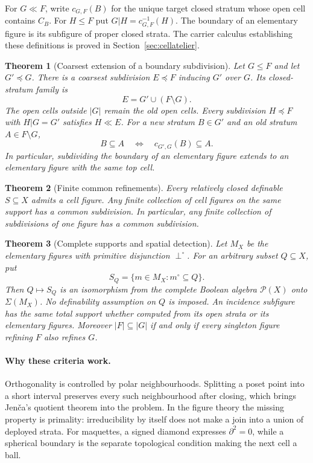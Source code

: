\documentclass[11pt,a4paper]{article}
\newtheorem{theorem}{Theorem}[section]
\theoremstyle{definition}
\begin{document}
For $G\ll F$, write $c_{G,F}(B)$ for the unique target closed stratum whose open cell contains $C_B$. For $H\le F$ put $G|H=c_{G,F}^{-1}(H)$. The boundary of an elementary figure is its subfigure of proper closed strata. The carrier calculus establishing these definitions is proved in Section~\ref{sec:cellatelier}.

\begin{theorem}[Coarsest extension of a boundary subdivision]\label{thm:extension}
Let $G\le F$ and let $G'\preceq G$. There is a coarsest subdivision $E\preceq F$ inducing $G'$ over $G$. Its closed-stratum family is
\[
 E=G'\cup(F\setminus G).
\]
The open cells outside $|G|$ remain the old open cells. Every subdivision $H\preceq F$ with $H|G=G'$ satisfies $H\ll E$. For a new stratum $B\in G'$ and an old stratum $A\in F\setminus G$,
\[
 B\subseteq A\quad\Longleftrightarrow\quad c_{G',G}(B)\subseteq A.
\]
In particular, subdividing the boundary of an elementary figure extends to an elementary figure with the same top cell.
\end{theorem}

\begin{theorem}[Finite common refinements]\label{thm:moderation}
Every relatively closed definable $S\subseteq X$ admits a cell figure. Any finite collection of cell figures on the same support has a common subdivision. In particular, any finite collection of subdivisions of one figure has a common subdivision.
\end{theorem}

\begin{theorem}[Complete supports and spatial detection]\label{thm:cellpowerset}
Let $M_X$ be the elementary figures with primitive disjunction $\perp^\circ$. For an arbitrary subset $Q\subseteq X$, put
\[
 S_Q=\{m\in M_X:m^\circ\subseteq Q\}.
\]
Then $Q\mapsto S_Q$ is an isomorphism from the complete Boolean algebra $\mathcal P(X)$ onto $\Sigma(M_X)$. No definability assumption on $Q$ is imposed. An incidence subfigure has the same total support whether computed from its open strata or its elementary figures. Moreover $|F|\subseteq|G|$ if and only if every singleton figure refining $F$ also refines $G$.
\end{theorem}



\paragraph{Why these criteria work.}
Orthogonality is controlled by polar neighbourhoods. Splitting a poset point into a short interval preserves every such neighbourhood after closing, which brings Jen\v ca's quotient theorem into the problem. In the figure theory the missing property is primality: irreducibility by itself does not make a join into a union of deployed strata. For maquettes, a signed diamond expresses $\partial^2=0$, while a spherical boundary is the separate topological condition making the next cell a ball.
\end{document}
